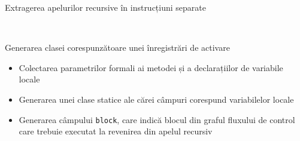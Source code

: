 \documentclass{beamer}
\def\code#1{\texttt{#1}}
\begin{document}
\begin{frame}{Extragerea apelurilor recursive în instrucțiuni separate}
    \begin{figure}[htb]
        \\
    \end{figure}
\end{frame}

\begin{frame}{Generarea clasei corespunzătoare unei înregistrări de activare}
    \begin{itemize}
        \item Colectarea parametrilor formali ai metodei și a declarațiilor de variabile locale
        \item Generarea unei clase statice ale cărei câmpuri corespund variabilelor locale
        \item Generarea câmpului \code{block}, care indică blocul din graful fluxului de control care trebuie executat
        la revenirea din apelul recursiv
    \end{itemize}
\end{frame}
\end{document}
